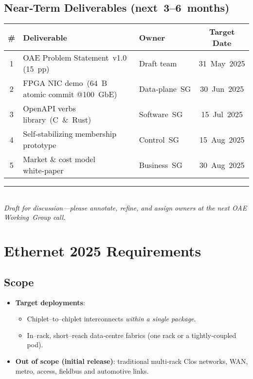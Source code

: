 \documentclass[../../../OAE-SPEC-MAIN.tex]{subfiles}
\begin{document}
\subsection{Near‑Term Deliverables (next 3–6 months)}
\footnotesize
\begin{center}
\begin{tabular}{@{}cllc@{}}
\toprule
\# & \textbf{Deliverable} & \textbf{Owner} & \textbf{Target Date}\\
\midrule
1 & OAE Problem Statement v1.0 (15 pp) & Draft team & 31 May 2025\\
2 & FPGA NIC demo (64 B atomic commit @100 GbE) & Data‑plane SG & 30 Jun 2025\\
3 & OpenAPI verbs library (C \& Rust) & Software SG & 15 Jul 2025\\
4 & Self‑stabilizing membership prototype & Control SG & 15 Aug 2025\\
5 & Market \& cost model white‑paper & Business SG & 30 Aug 2025\\
\bottomrule
\end{tabular}
\end{center}

\vfill
\begin{center}
\rule{0.6\linewidth}{0.4pt}\\
\footnotesize
\textit{Draft for discussion—please annotate, refine, and assign owners at the next OAE Working Group call.}
\end{center}
 
 
 
 
\section{Ethernet 2025 Requirements}

\subsection{Scope}
\begin{itemize}
  \item \textbf{Target deployments}:  
        \begin{itemize}
            \item Chiplet–to–chiplet interconnects \emph{within a single package}.  
            \item In–rack, short–reach data‑centre fabrics (one rack or a tightly‑coupled pod).  
        \end{itemize}
  \item \textbf{Out of scope (initial release)}:  
        traditional multi‑rack Clos networks, WAN, metro, access, fieldbus and automotive links.
\end{itemize}
\end{document}
